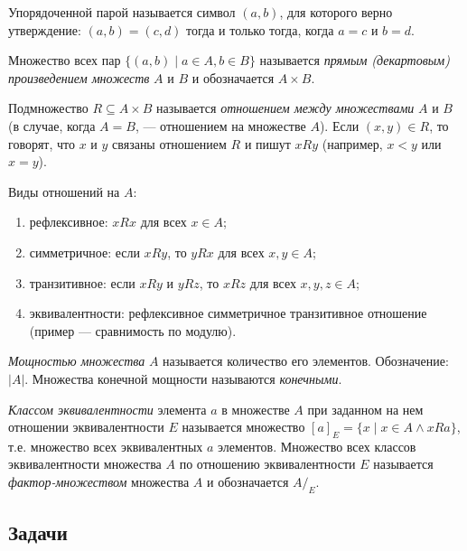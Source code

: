 Упорядоченной парой называется символ $(a,b)$, для которого верно утверждение: $(a,b)=(c,d)$ тогда и только тогда, когда $a=c$ и $b=d$.

Множество всех пар $\{(a,b)\mid a\in A, b\in B\}$ называется \textit{прямым (декартовым) произведением множеств} $A$ и $B$ и обозначается $A\times B$.

Подмножество $R\subseteq A\times B$ называется \textit{отношением между множествами} $A$ и $B$ (в случае, когда $A=B$, --- отношением на множестве $A$). Если $(x,y)\in R$, то говорят, что $x$ и $y$ связаны отношением $R$ и пишут $xRy$ (например, $x<y$ или $x=y$).

Виды отношений на $A$:
\begin{enumerate}
\item рефлексивное: $xRx$ для всех $x\in A$;
\item симметричное: если $xRy$, то $yRx$ для всех $x,y\in A$;
\item транзитивное: если $xRy$ и $yRz$, то $xRz$ для всех $x,y,z\in A$;
\item эквивалентности: рефлексивное симметричное транзитивное отношение (пример --- сравнимость по модулю).
\end{enumerate}

\textit{Мощностью множества} $A$ называется количество его элементов. Обозначение: $|A|$. Множества конечной мощности называются \textit{конечными}.

\textit{Классом эквивалентности} элемента $a$ в множестве $A$ при заданном на нем отношении эквивалентности $E$ называется множество $[a]_E=\{x\mid x\in A\land xRa\}$, т.е. множество всех эквивалентных $a$ элементов. Множество всех классов эквивалентности множества $A$ по отношению эквивалентности $E$ называется \textit{фактор-множеством} множества $A$ и обозначается $A/_E$.

\subsection*{Задачи}

